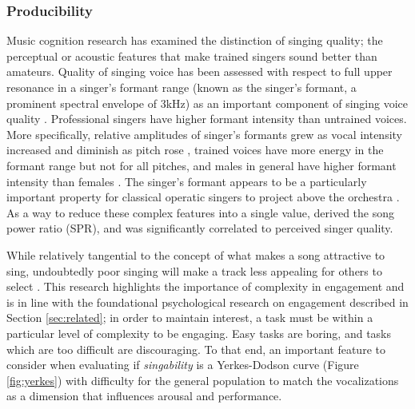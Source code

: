 \subsubsection{Producibility}
Music cognition research has examined the distinction of singing quality; the perceptual or acoustic features that make trained singers sound better than amateurs. Quality of singing voice has been assessed with respect to full upper resonance in a singer's formant range (known as the singer's formant, a prominent spectral envelope of 3kHz) as an important component of singing voice quality \cite{bartholomew1934physical}. Professional singers have higher formant intensity than untrained voices. More specifically, relative amplitudes of singer's formants grew as vocal intensity increased and diminish as pitch rose \cite{schultz19793}, trained voices have more energy in the formant range but not for all pitches, and males in general have higher formant intensity than females \cite{schultz19793}. The singer's formant appears to be a particularly important property for classical operatic singers to project above the orchestra \cite{sundberg2001level}. As a way to reduce these complex features into a single value, \cite{omori1996singing} derived the song power ratio (SPR), and was significantly correlated to perceived singer quality.

While relatively tangential to the concept of what makes a song attractive to sing, undoubtedly poor singing will make a track less appealing for others to select \cite{yerkes1908relation,berlyne1970novelty,csikszentmihalyi1996flow}. This research highlights the importance of complexity in engagement and is in line with the foundational psychological research on engagement described in Section \ref{sec:related}; in order to maintain interest, a task must be within a particular level of complexity to be engaging. Easy tasks are boring, and tasks which are too difficult are discouraging. To that end, an important feature to consider when evaluating if \textit{singability} is a Yerkes-Dodson curve (Figure \ref{fig:yerkes}) with difficulty for the general population to match the vocalizations as a dimension that influences arousal and performance.

